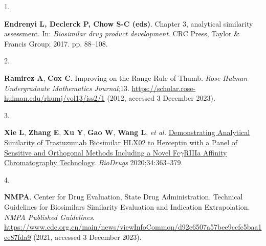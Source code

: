 \documentclass[
  12pt,
  a4paper,
]{article}
\newlength{\cslhangindent}
\newlength{\csllabelwidth}
\newlength{\cslentryspacingunit} %
\newenvironment{CSLReferences}[2] %
 {%
  \setlength{\parindent}{0pt}
  \ifodd #1
  \let\oldpar\par
  \def\par{\hangindent=\cslhangindent\oldpar}
  \fi
  \setlength{\parskip}{#2\cslentryspacingunit}
 }%
 {}
\newcommand{\CSLLeftMargin}[1]{\parbox[t]{\csllabelwidth}{#1}}
\newcommand{\CSLRightInline}[1]{\parbox[t]{\linewidth - \csllabelwidth}{#1}\break}
\numberwithin{equation}{section}
\theoremstyle{plain}
\theoremstyle{definition}
\theoremstyle{remark}
\theoremstyle{note}
\begin{document}
\hypertarget{refs}{}
\begin{CSLReferences}{0}{0}
\leavevmode{}%
\CSLLeftMargin{1. }%
\CSLRightInline{\textbf{Endrenyi L, Declerck P, Chow S-C (eds)}. Chapter
3, analytical similarity assessment. In: \emph{Biosimilar drug product
development}. CRC Press, Taylor \& Francis Group; 2017. pp. 88--108.}

\leavevmode{}%
\CSLLeftMargin{2. }%
\CSLRightInline{\textbf{Ramirez A}, \textbf{Cox C}. Improving on the
{Range} {Rule} of {Thumb}. \emph{Rose-Hulman Undergraduate Mathematics
Journal};13. \url{https://scholar.rose-hulman.edu/rhumj/vol13/iss2/1}
(2012, accessed 3 December 2023).}

\leavevmode{}%
\CSLLeftMargin{3. }%
\CSLRightInline{\textbf{Xie L}, \textbf{Zhang E}, \textbf{Xu Y},
\textbf{Gao W}, \textbf{Wang L}, \emph{et al.}
\href{https://doi.org/10.1007/s40259-020-00407-0}{Demonstrating
{Analytical} {Similarity} of {Trastuzumab} {Biosimilar} {HLX02} to
{Herceptin}{\textregistered} with a {Panel} of {Sensitive} and
{Orthogonal} {Methods} {Including} a {Novel} {Fc\(\gamma\)RIIIa}
{Affinity} {Chromatography} {Technology}}. \emph{BioDrugs}
2020;34:363--379.}

\leavevmode{}%
\CSLLeftMargin{4. }%
\CSLRightInline{\textbf{NMPA}. Center for {Drug} {Evaluation}, {State}
{Drug} {Administration}. {Technical} {Guidelines} for {Biosimilars}
{Similarity} {Evaluation} and {Indication} {Extrapolation}. \emph{NMPA
Published Guidelines}.
\url{https://www.cde.org.cn/main/news/viewInfoCommon/d92c6507a57bee9ccfc5baa1ee87fda9}
(2021, accessed 3 December 2023).}

\end{CSLReferences}
\end{document}
